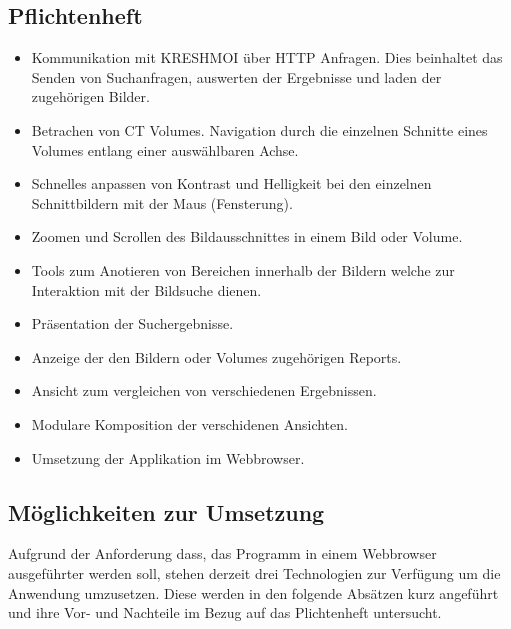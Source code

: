 \subsection{Pflichtenheft}
\label{sec:Pflichtenheft}
\begin{itemize}
	\item Kommunikation mit KRESHMOI über HTTP Anfragen. Dies beinhaltet das Senden von Suchanfragen, auswerten der Ergebnisse und laden der zugehörigen Bilder.
	\item Betrachen von CT Volumes. Navigation durch die einzelnen Schnitte eines Volumes entlang einer auswählbaren Achse.
	\item Schnelles anpassen von Kontrast und Helligkeit bei den einzelnen Schnittbildern mit der Maus (Fensterung).
	\item Zoomen und Scrollen des Bildausschnittes in einem Bild oder Volume.
	\item Tools zum Anotieren von Bereichen innerhalb der Bildern welche zur Interaktion mit der Bildsuche dienen.
	\item Präsentation der Suchergebnisse.
	\item Anzeige der den Bildern oder Volumes zugehörigen Reports.
	\item Ansicht zum vergleichen von verschiedenen Ergebnissen.
	\item Modulare Komposition der verschidenen Ansichten.
	\item Umsetzung der Applikation im Webbrowser.
\end{itemize}

\subsection{Möglichkeiten zur Umsetzung}
\label{sec:Möglichkeiten zur Umsetzung}
Aufgrund der Anforderung dass, das Programm in einem Webbrowser ausgeführter werden soll, stehen derzeit drei Technologien zur Verfügung um die Anwendung umzusetzen.
Diese werden in den folgende Absätzen kurz angeführt und ihre Vor- und Nachteile im Bezug auf das Plichtenheft untersucht.


